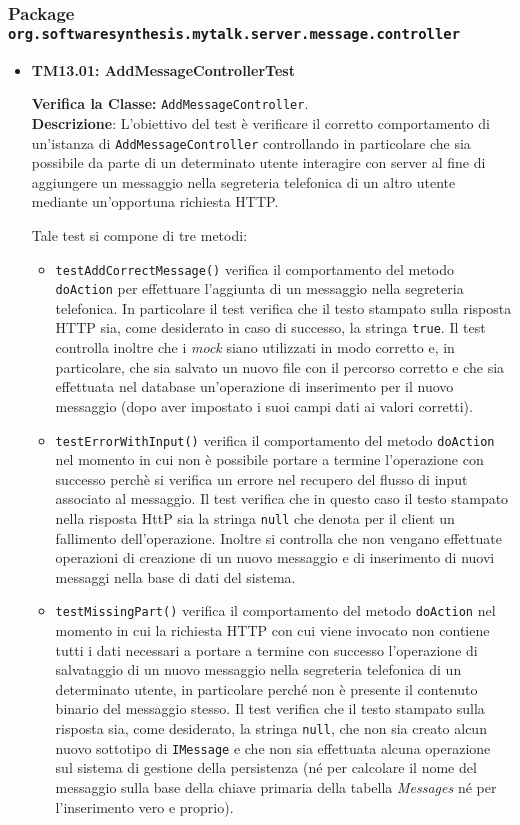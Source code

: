 \subsubsection{Package \texttt{org.softwaresynthesis.mytalk.server.message.controller}}
\begin{itemize}

\item[\passed] \textbf{TM13.01: AddMessageControllerTest} 

\textbf{Verifica la Classe:} \texttt{AddMessageController}.\\
\textbf{Descrizione}: L'obiettivo del test è verificare il corretto comportamento di un'istanza di \texttt{AddMessageController} controllando in particolare che sia possibile da parte di un determinato utente interagire con server al fine di aggiungere un messaggio nella segreteria telefonica di un altro utente mediante un'opportuna richiesta HTTP\@.

Tale test si compone di tre metodi:
\begin{itemize}
\item \texttt{testAddCorrectMessage()} verifica il comportamento del metodo \texttt{doAction} per effettuare l'aggiunta di un messaggio nella segreteria telefonica. In particolare il test verifica che il testo stampato sulla risposta HTTP sia, come desiderato in caso di successo, la stringa \texttt{true}. Il test controlla inoltre che i \textit{mock} siano utilizzati in modo corretto e, in particolare, che sia salvato un nuovo file con il percorso corretto e che sia effettuata nel database un'operazione di inserimento per il nuovo messaggio (dopo aver impostato i suoi campi dati ai valori corretti).

\item \texttt{testErrorWithInput()} verifica il comportamento del metodo \texttt{doAction} nel momento in cui non è possibile portare a termine l'operazione con successo perchè si verifica un errore nel recupero del flusso di input associato al messaggio. Il test verifica che in questo caso il testo stampato nella risposta HttP sia la stringa \texttt{null} che denota per il client un fallimento dell'operazione. Inoltre si controlla che non vengano effettuate operazioni di creazione di un nuovo messaggio e di inserimento di nuovi messaggi nella base di dati del sistema.

\item \texttt{testMissingPart()} verifica il comportamento del metodo \texttt{doAction} nel momento in cui la richiesta HTTP con cui viene invocato non contiene tutti i dati necessari a portare a termine con successo l'operazione di salvataggio di un nuovo messaggio nella segreteria telefonica di un determinato utente, in particolare perché non è presente il contenuto binario del messaggio stesso. Il test verifica che il testo stampato sulla risposta sia, come desiderato, la stringa \texttt{null}, che non sia creato alcun nuovo  sottotipo di \texttt{IMessage} e che non sia effettuata alcuna operazione sul sistema di gestione della persistenza (né per calcolare il nome del messaggio sulla base della chiave primaria della tabella \textsl{Messages} né per l'inserimento vero e proprio).


\end{itemize}
\end{itemize}
